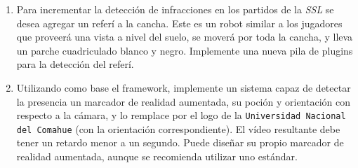 \begin{enumerate}

	\item{Para incrementar la detección de infracciones en los partidos de
		la \emph{SSL} se desea agregar un referí a la cancha. Este es un
		robot similar a los jugadores que proveerá una vista a nivel del
		suelo, se moverá por toda la cancha, y lleva un parche
		cuadriculado blanco y negro. Implemente una nueva pila de
		plugins para la detección del referí.}

	\item{Utilizando como base el framework, implemente un sistema capaz de
		detectar la presencia un marcador de realidad aumentada, su poción y
		orientación con respecto a la cámara, y lo remplace por el logo
		de la \texttt{Universidad Nacional del Comahue} (con la
		orientación correspondiente). El vídeo resultante debe tener un
		retardo menor a un segundo. Puede diseñar su propio marcador de
		realidad aumentada, aunque se recomienda utilizar uno estándar.}

\end{enumerate}
